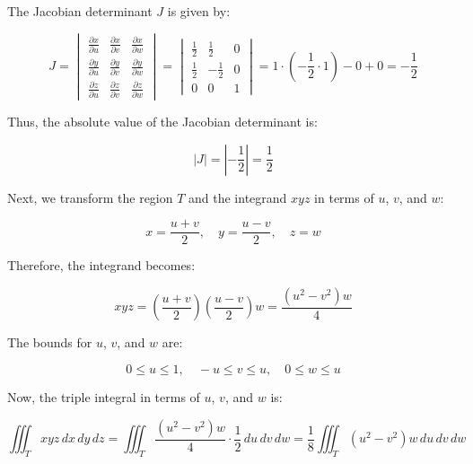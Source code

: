 \documentclass{article}
\begin{document}
The Jacobian determinant \( J \) is given by:



\[
J = \begin{vmatrix}
\frac{\partial x}{\partial u} & \frac{\partial x}{\partial v} & \frac{\partial x}{\partial w} \\
\frac{\partial y}{\partial u} & \frac{\partial y}{\partial v} & \frac{\partial y}{\partial w} \\
\frac{\partial z}{\partial u} & \frac{\partial z}{\partial v} & \frac{\partial z}{\partial w}
\end{vmatrix}
= \begin{vmatrix}
\frac{1}{2} & \frac{1}{2} & 0 \\
\frac{1}{2} & -\frac{1}{2} & 0 \\
0 & 0 & 1
\end{vmatrix}
= 1 \cdot \left( -\frac{1}{2} \cdot 1 \right) - 0 + 0 = -\frac{1}{2}
\]



Thus, the absolute value of the Jacobian determinant is:



\[
|J| = \left| -\frac{1}{2} \right| = \frac{1}{2}
\]



Next, we transform the region \( T \) and the integrand \( x y z \) in terms of \( u \), \( v \), and \( w \):



\[
x = \frac{u+v}{2}, \quad y = \frac{u-v}{2}, \quad z = w
\]



Therefore, the integrand becomes:



\[
x y z = \left( \frac{u+v}{2} \right) \left( \frac{u-v}{2} \right) w = \frac{(u^2 - v^2)w}{4}
\]



The bounds for \( u \), \( v \), and \( w \) are:



\[
0 \leq u \leq 1, \quad -u \leq v \leq u, \quad 0 \leq w \leq u
\]



Now, the triple integral in terms of \( u \), \( v \), and \( w \) is:



\[
\iiint_{T} x y z \, dx \, dy \, dz = \iiint_{T} \frac{(u^2 - v^2)w}{4} \cdot \frac{1}{2} \, du \, dv \, dw = \frac{1}{8} \iiint_{T} (u^2 - v^2) w \, du \, dv \, dw
\]
\end{document}
